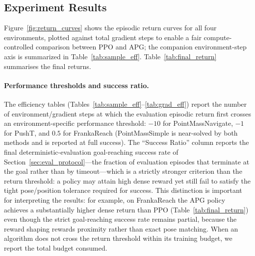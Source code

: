 \documentclass[11pt,a4paper]{article}
\begin{document}
\subsection{Experiment Results}
\label{sec:results}

Figure~\ref{fig:return_curves} shows the episodic return curves for all four environments, plotted against total gradient steps to enable a fair compute-controlled comparison between PPO and APG; the companion environment-step axis is summarized in Table~\ref{tab:sample_eff}. Table~\ref{tab:final_return} summarises the final returns.

\paragraph{Performance thresholds and success ratio.}
The efficiency tables (Tables~\ref{tab:sample_eff}--\ref{tab:grad_eff}) report the number of environment/gradient steps at which the evaluation episodic return first crosses an environment-specific performance threshold: $-10$ for PointMassNavigate, $-1$ for PushT, and $0.5$ for FrankaReach (PointMassSimple is near-solved by both methods and is reported at full success). The ``Success Ratio'' column reports the final deterministic-evaluation goal-reaching success rate of Section~\ref{sec:eval_protocol}---the fraction of evaluation episodes that terminate at the goal rather than by timeout---which is a strictly stronger criterion than the return threshold: a policy may attain high dense reward yet still fail to satisfy the tight pose/position tolerance required for success. This distinction is important for interpreting the results: for example, on FrankaReach the APG policy achieves a substantially higher dense return than PPO (Table~\ref{tab:final_return}) even though the strict goal-reaching success rate remains partial, because the reward shaping rewards proximity rather than exact pose matching. When an algorithm does not cross the return threshold within its training budget, we report the total budget consumed.
\end{document}
